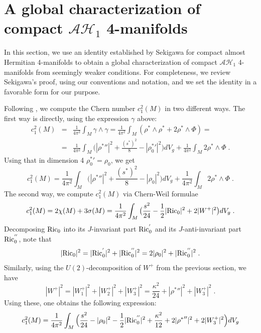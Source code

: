 \documentclass{amsart}
\begin{document}
\section{A global characterization of compact $\mathcal{AH}_1$ 4-manifolds}

In this section, we use an identity established by Sekigawa \cite{Sek87} for compact almost Hermitian 4-manifolds to obtain a global characterization of compact $\mathcal{AH}_1$ 4-manifolds from seemingly weaker conditions. For completeness, we review Sekigawa's proof, using our conventions and notation, and we set the identity in a favorable form for our purpose.



Following \cite{Sek87}, we compute the Chern number $c_1^2(M)$ in two different ways. The first way is directly, using the expression $\gamma$ above:
\begin{eqnarray}  \nonumber
c_1^2(M) &=& \frac{1}{4 \pi^2} \int_M \gamma \wedge \gamma =  \frac{1}{4 \pi^2} \int_M ( \rho^* \wedge \rho^* + 2 \rho^* \wedge \Phi ) = \\ \nonumber
&=&  \frac{1}{4 \pi^2} \int_M \Big( |{\rho^*}''|^2 + \frac{(s^*)^2}{8} - |{\rho_0^*} '|^2 \Big) dV_g 
+ \frac{1}{4 \pi^2} \int_M 2 \rho^* \wedge \Phi \; .
\end{eqnarray}
Using that in dimension 4 ${\rho_0^*}' = \rho_0$, we get 
\begin{equation} \label{c1sqv1}
c_1^2(M) = \frac{1}{4 \pi^2} \int_M \Big( |{\rho^*}''|^2 + \frac{(s^*)^2}{8} - |\rho_0|^2 \Big) dV_g
+ \frac{1}{4 \pi^2} \int_M 2 \rho^* \wedge \Phi \; .
\end{equation}
The second way, we compute $c_1^2(M)$ via Chern-Weil formulae
$$c_1^2(M) = 2\chi(M) + 3 \sigma(M) = \frac{1}{4 \pi^2} \int_M \big( \frac{s^2}{24} - \frac{1}{2} |{\rm Ric}_0 |^2 + 2 |W^+|^2 \big) dV_g \; .$$
Decomposing ${\rm Ric}_0$ into its $J$-invariant part ${\rm Ric}_0^{'}$ and its $J$-anti-invariant part ${\rm Ric}_0^{''}$, note that 
$$ |{\rm Ric}_0|^2 = | {\rm Ric}_0^{'} |^2 + |{\rm Ric}_0^{''}|^2 = 2 |\rho_0 |^2 + |{\rm Ric}_0^{''}|^2 \; .$$
Similarly, using the $U(2)$-decomposition of $W^+$ from the previous section, we have
$$|W^+|^2 = |W^+_1|^2 + |W^+_2|^2 + |W^+_3|^2 = \frac{\kappa^2}{24} + |{\rho^*}''|^2 + |W^+_3|^2 \; .$$
Using these, one obtains the following expression:
\begin{equation} \label{c1sqv2}
c_1^2(M) = \frac{1}{4 \pi^2} \int_M \Big( \frac{s^2}{24} - |\rho_0 |^2 - \frac{1}{2} |{\rm Ric}_0^{''} |^2 + \frac{\kappa^2}{12} + 2|{\rho^*}''|^2 + 2|W^+_3|^2 \Big) dV_g 
\end{equation}
\end{document}
